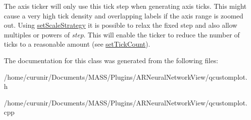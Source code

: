 The axis ticker will only use this tick step when generating axis ticks. This might cause a very high tick density and overlapping labels if the axis range is zoomed out. Using \hyperlink{class_q_c_p_axis_ticker_fixed_acbc7c9bcd80b3dc3edee5f0519d301f6}{set\+Scale\+Strategy} it is possible to relax the fixed step and also allow multiples or powers of {\itshape step}. This will enable the ticker to reduce the number of ticks to a reasonable amount (see \hyperlink{class_q_c_p_axis_ticker_a47752abba8293e6dc18491501ae34008}{set\+Tick\+Count}). 

The documentation for this class was generated from the following files\+:\begin{DoxyCompactItemize}
\item 
/home/curunir/\+Documents/\+M\+A\+S\+S/\+Plugins/\+A\+R\+Neural\+Network\+View/qcustomplot.\+h\item 
/home/curunir/\+Documents/\+M\+A\+S\+S/\+Plugins/\+A\+R\+Neural\+Network\+View/qcustomplot.\+cpp\end{DoxyCompactItemize}
